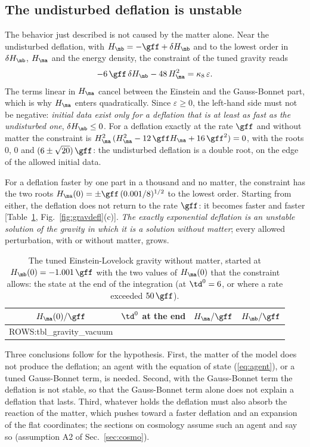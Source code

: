 \subsection{The undisturbed deflation is unstable}

The behavior just described is not caused by the matter alone. Near the undisturbed deflation, with
$H_{\mb}=-\gff+\delta H_{\mb}$ and to the lowest order in $\delta H_{\mb}$, $H_{\ma}$ and the energy
density, the constraint of the tuned gravity reads
\begin{equation}
-6\,\gff\,\delta H_{\mb}-48\,H_{\ma}^{2}=\kappa_8\,\varepsilon .
\label{eq:constraint}
\end{equation}
The terms linear in $H_{\ma}$ cancel between the Einstein and the Gauss-Bonnet part, which is why
$H_{\ma}$ enters quadratically. Since $\varepsilon\ge0$, the left-hand side must not be negative:
\emph{initial data exist only for a deflation that is at least as fast as the undisturbed one},
$\delta H_{\mb}\le0$. For a deflation exactly at the rate $\gff$ and without matter the constraint is
$H_{\ma}^{2}\,(H_{\ma}^{2}-12\,\gff H_{\ma}+16\,\gff^{2})=0$, with the roots $0$, $0$ and
$(6\pm\sqrt{20})\,\gff$: the undisturbed deflation is a double root, on the edge of the allowed
initial data.

For a deflation faster by one part in a thousand and no matter, the constraint has the two roots
$H_{\ma}(0)=\pm\gff\,(0.001/8)^{1/2}$ to the lowest order. Starting from either, the deflation does
not return to the rate $\gff$: it becomes faster and faster
[Table~\ref{tab:gravvac}, Fig.~\ref{fig:gravdefl}(c)]. \emph{The exactly exponential deflation is an
unstable solution of the gravity in which it is a solution without matter}; every allowed
perturbation, with or without matter, grows.

\begin{table}
\caption{\label{tab:gravvac}The tuned Einstein-Lovelock gravity without matter, started at
$H_{\mb}(0)=-1.001\,\gff$ with the two values of $H_{\ma}(0)$ that the constraint allows: the state
at the end of the integration (at $\td^{0}=6$, or where a rate exceeded $50\,\gff$).}
\begin{ruledtabular}
\begin{tabular}{cccc}
$H_{\ma}(0)/\gff$ & $\td^{0}$ at the end & $H_{\ma}/\gff$ & $H_{\mb}/\gff$ \\
\hline
{{ROWS:tbl_gravity_vacuum}}
\end{tabular}
\end{ruledtabular}
\end{table}

Three conclusions follow for the hypothesis. First, the matter of the model does not produce the
deflation; an agent with the equation of state (\ref{eq:agent}), or a tuned Gauss-Bonnet term, is
needed. Second, with the Gauss-Bonnet term the deflation is not stable, so that the Gauss-Bonnet term
alone does not explain a deflation that lasts. Third, whatever holds the deflation must also absorb
the reaction of the matter, which pushes toward a faster deflation and an expansion of the flat
coordinates; the sections on cosmology assume such an agent and say so (assumption A2 of
Sec.~\ref{sec:cosmo}).
